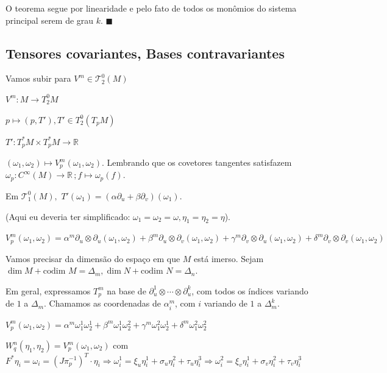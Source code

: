 \documentclass[10pt,a4paper]{article}
\begin{document}
		O teorema segue por linearidade e pelo fato de todos os mon\^omios do sistema principal serem de grau $k.\,\,\blacksquare$

		\subsection{Tensores covariantes, Bases contravariantes}
		\begin{flushright}
		\end{flushright}

		Vamos subir para $V^m \in \mathcal{T}_2^0(M)$

		$V^m : M \rightarrow T_2^0 M$

		$p \mapsto (p, T'), T' \in T_2^0(T_pM)$

		$T' : T_p^*M \times T_p^*M \rightarrow \mathbb{R}$

		$(\omega_1, \omega_2) \mapsto V_p^m(\omega_1, \omega_2)$. Lembrando que os covetores tangentes satisfazem $\omega_p : C^\infty(M) \rightarrow \mathbb{R} \,; f \mapsto \omega_p(f) $.

		Em $\mathcal{T}_1^0(M), \,\,T'(\omega_1) = (\alpha \partial_u + \beta \partial_v) (\omega_1)$.

		(Aqui eu deveria ter simplificado: $\omega_1 = \omega_2 = \omega, \eta_1 = \eta_2 = \eta$).

		$V_p^m(\omega_1, \omega_2) = \alpha^m \partial_u \otimes \partial_u (\omega_1, \omega_2) + \beta^m \partial_u \otimes \partial_v (\omega_1, \omega_2) + \gamma^m \partial_v \otimes \partial_u (\omega_1, \omega_2) + \delta^m \partial_v \otimes \partial_v (\omega_1, \omega_2)$

		Vamos precisar da dimens\~ao do espa\c{c}o em que $M$ est\'a imerso. Sejam $\dim M + \text{codim } M = \Delta_m, \dim N + \text{codim } N = \Delta_n$.

		Em geral, expressamos $T_p^m$ na base de $\partial_u^1 \otimes \cdots \otimes \partial_u^k$, com todos os \'indices variando de $1$ a $\Delta_m$. Chamamos as coordenadas de $\alpha_i^m$, com $i$ variando de $1$ a $\Delta_m^k$.

		\vspace{3mm}

		$V_p^m(\omega_1, \omega_2) = \alpha^m \omega_1^1 \omega_2^1 + \beta^m \omega_1^1 \omega_2^2 + \gamma^m \omega_1^2 \omega_2^1 + \delta^m \omega_1^2 \omega_2^2$

		$W_q^n(\eta_1, \eta_2) = V_p^m(\omega_1, \omega_2)$ com $F^*\eta_i = \omega_i = (J\pi^{-1}_p)^T \cdot \eta_i \Rightarrow \omega_i^1 = \xi_u \eta_i^1 + \sigma_u \eta_i^2 + \tau_u \eta_i^3 \Rightarrow \omega_i^2 = \xi_v \eta_i^1 + \sigma_v \eta_i^2 + \tau_v \eta_i^3$
\end{document}
